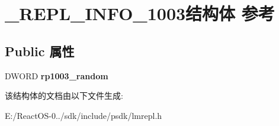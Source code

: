 \hypertarget{struct___r_e_p_l___i_n_f_o__1003}{}\section{\+\_\+\+R\+E\+P\+L\+\_\+\+I\+N\+F\+O\+\_\+1003结构体 参考}
\label{struct___r_e_p_l___i_n_f_o__1003}
\subsection*{Public 属性}
\begin{DoxyCompactItemize}
\item 
\mbox{\label{struct___r_e_p_l___i_n_f_o__1003_a83d3552fcbbc8954555b28eda1e8aaa4}} 
D\+W\+O\+RD {\bfseries rp1003\+\_\+random}
\end{DoxyCompactItemize}


该结构体的文档由以下文件生成\+:\begin{DoxyCompactItemize}
\item 
E\+:/\+React\+O\+S-\/0../sdk/include/psdk/lmrepl.\+h\end{DoxyCompactItemize}
